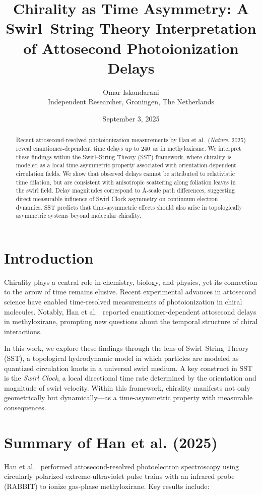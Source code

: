 \documentclass[smallextended]{svjour3}       %
\title{Chirality as Time Asymmetry: A Swirl--String Theory Interpretation of Attosecond Photoionization Delays}
\author{Omar Iskandarani\\\small Independent Researcher, Groningen, The Netherlands}
\date{September 3, 2025}
\begin{document}
\maketitle


\begin{abstract}
Recent attosecond-resolved photoionization measurements by Han et al.~(\emph{Nature}, 2025) reveal enantiomer-dependent time delays up to \SI{240}{\atto\second} in methyloxirane. We interpret these findings within the Swirl--String Theory (SST) framework, where chirality is modeled as a local time-asymmetric property associated with orientation-dependent circulation fields. We show that observed delays cannot be attributed to relativistic time dilation, but are consistent with anisotropic scattering along foliation leaves in the swirl field. Delay magnitudes correspond to \AA-scale path differences, suggesting direct measurable influence of Swirl Clock asymmetry on continuum electron dynamics. SST predicts that time-asymmetric effects should also arise in topologically asymmetric systems beyond molecular chirality.
\end{abstract}



\section{Introduction}
Chirality plays a central role in chemistry, biology, and physics, yet its connection to the arrow of time remains elusive. Recent experimental advances in attosecond science have enabled time-resolved measurements of photoionization in chiral molecules. Notably, Han et al.~\cite{Han2025} reported enantiomer-dependent attosecond delays in methyloxirane, prompting new questions about the temporal structure of chiral interactions.


In this work, we explore these findings through the lens of Swirl--String Theory (SST), a topological hydrodynamic model in which particles are modeled as quantized circulation knots in a universal swirl medium. A key construct in SST is the \emph{Swirl Clock}, a local directional time rate determined by the orientation and magnitude of swirl velocity. Within this framework, chirality manifests not only geometrically but dynamically---as a time-asymmetric property with measurable consequences.


\section{Summary of Han et al. (2025)}
Han et al.~\cite{Han2025} performed attosecond-resolved photoelectron spectroscopy using circularly polarized extreme-ultraviolet pulse trains with an infrared probe (RABBIT) to ionize gas-phase methyloxirane. Key results include:
\end{document}
